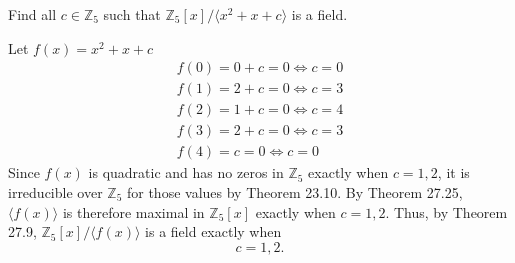 \documentclass[11pt]{article}
\begin{document}
\begin{problem}[27.8]
    Find all $c \in \mathbb{Z}_5$ such that $\mathbb{Z}_5[x]/ \langle x^2 + x + c\rangle$ is a field.
\end{problem}
\begin{solution}
    Let $f(x) = x^2 + x + c$
    \begin{align*}
        f(0) = 0 + c = 0 \iff c = 0\\
        f(1) = 2 + c = 0 \iff c = 3\\
        f(2) = 1 + c = 0 \iff c = 4\\
        f(3) = 2 + c = 0 \iff c = 3\\
        f(4) = c = 0 \iff c = 0
    \end{align*}
    Since $f(x)$ is quadratic and has no zeros in $\mathbb{Z}_5$ exactly
    when $c=1,2$, it is irreducible over $\mathbb{Z}_5$ for those values
    by Theorem 23.10.
    By Theorem 27.25, $\langle f(x)\rangle$ is therefore maximal in
    $\mathbb{Z}_5[x]$ exactly when $c=1,2$. Thus, by Theorem 27.9,
    $\mathbb{Z}_5[x]/\langle f(x)\rangle$ is a field exactly when
    \[
        \boxed{c=1,2}.
    \]
\end{solution}
\end{document}
